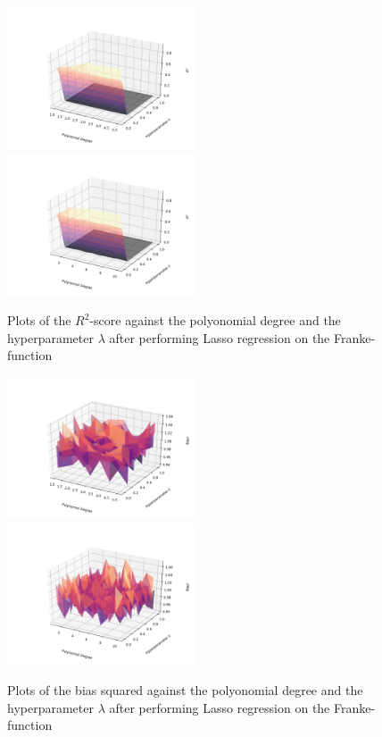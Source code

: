\documentclass[a4paper,10pt,english]{article}
\begin{document}
\begin{figure}[H]
	\centering 
	\includegraphics[width = 0.5\textwidth, center]{../franke_output/part_E_3.png}
	\includegraphics[width = 0.5\textwidth, center]{../franke_output/part_E_3_highdeg.png}
	\caption{
		Plots of the $R^2$-score against the polyonomial degree and the hyperparameter $\lambda$ after performing Lasso regression on the Franke-function
	}
	\label{part_e3}
\end{figure}

\begin{figure}[H]
	\centering 
	\includegraphics[width = 0.5\textwidth, center]{../franke_output/part_E_4.png}
	\includegraphics[width = 0.5\textwidth, center]{../franke_output/part_E_4_highdeg.png}
	\caption{
		Plots of the bias squared against the polyonomial degree and the hyperparameter $\lambda$ after performing Lasso regression on the Franke-function 
	}
	\label{part_e4}
\end{figure}
\end{document}
